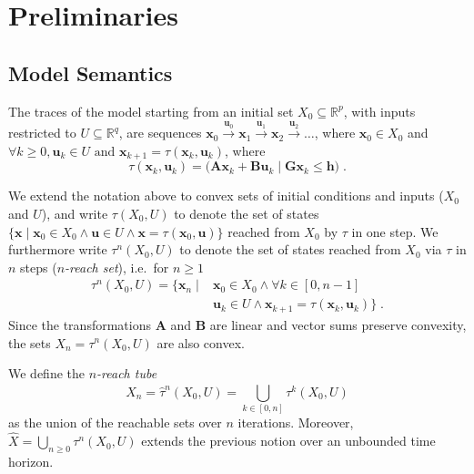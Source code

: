 \documentclass[sigconf]{llncs}
\newcommand{\mat}[1]{\boldsymbol{#1}}
\renewcommand{\vec}[1]{\boldsymbol{#1}}
\begin{document}
\section{Preliminaries}
\label{sec:preliminaries}

\subsection{Model Semantics}\label{sec:model_semantics}


The traces of the model starting from an initial set $X_0\subseteq \mathbb{R}^p$, 
with inputs restricted to $U \subseteq \mathbb{R}^q$, are sequences 
$ \vec{x}_0 \xrightarrow{\vec{u}_0} \vec{x}_1 \xrightarrow{\vec{u}_1} \vec{x}_2 \xrightarrow{\vec{u}_2} \ldots $, 
%
where $ \vec{x}_0 \in X_0$ and $\forall k\geq 0, \vec{u}_k \in U \text{ and } \vec{x}_{k+1} = \tau(\vec{x}_k,\vec{u}_k) $, 
where 
%
\begin{equation}\label{equ:reachtraj}
\tau(\vec{x}_k,\vec{u}_k) = 
\big( \mat{A}\vec{x}_k +
\mat{B}\vec{u}_k \mid \mat{G}\vec{x}_k \leq \vec{h}\big)\;. 
\end{equation}

We extend the notation above to convex sets of initial conditions and inputs ($X_0$ and $U$), 
and write $\tau(X_0,U)$ to denote the set of states $\{\vec{x} \mid \vec{x}_0 \in
X_0 \wedge \vec{u} \in U \wedge \vec{x} = \tau(\vec{x}_0,\vec{u})\}$
reached from $X_0$ by $\tau$ in one step. 
%
We furthermore write $\tau^n(X_0,U)$ to denote the set of states reached from
$X_0$ via $\tau$ in $n$ steps (\emph{$n$-reach set}), i.e.\ for $n\geq 1$
%
\begin{align}\label{equ:reachset}
\tau^n(X_0,U) = \{\vec{x}_n \mid &\vec{x}_0 \in X_0 \wedge \forall k\in [0,n-1]\nonumber\\ 
 &\vec{u}_{k} \in U \wedge \vec{x}_{k+1}=\tau(\vec{x}_{k},\vec{u}_{k}) \} \;. 
\end{align}
%
Since the transformations $\mat{A}$ and $\mat{B}$ are linear and
vector sums preserve convexity, the sets $X_n = \tau^n(X_0,U)$ are also
convex.

We define the \emph{$n$-reach tube} 
\begin{equation}\label{equ:reachtube}
\hat{X}_n=\hat{\tau}^n(X_0,U)=\bigcup_{k\in[0,n]} \tau^k(X_0,U)
\end{equation}
as the union of the reachable sets over $n$ iterations.
%
Moreover, $\hat{X} 
=\bigcup_{n\geq 0} \tau^n(X_0,U)$ 
extends the previous notion over an 
unbounded time horizon.
\end{document}
